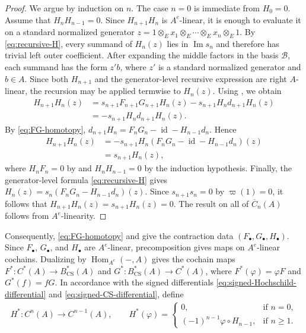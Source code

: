 \documentclass[11pt,a4paper,reqno]{amsart}
\newcommand{\mB}{\mathcal B}
\newcommand{\Hom}{\operatorname{Hom}}
\newcommand{\id}{\operatorname{id}}
\theoremstyle{plain}
\theoremstyle{definition}
\numberwithin{equation}{section}
\begin{document}
	\begin{proof}
		We argue by induction on $n$.  The case $n=0$ is immediate from $H_0=0$.
		Assume that
		$H_nH_{n-1}=0$.
		Since $H_{n+1}H_n$ is $A^e$-linear, it is enough to evaluate it on a
		standard normalized generator
		$z= 1\otimes_E x_1\otimes_E\cdots\otimes_E x_n\otimes_E1$.
		By \eqref{eq:recursive-H}, every summand of $H_n(z)$ lies in
		$\operatorname{Im}s_n$ and therefore has trivial left outer coefficient.
		After expanding the middle factors in the basis $\mB$, each summand
		has the form $z'b$, where $z'$ is a standard normalized generator and
		$b\in A$. Since both $H_{n+1}$ and the generator-level recursive expression
		are right $A$-linear, the recursion may be applied termwise to $H_n(z)$.
		Using , we obtain
		\begin{align*}
			H_{n+1}H_n(z)
			&=
			s_{n+1}F_{n+1}G_{n+1}H_n(z)
			-
			s_{n+1}H_nd_{n+1}H_n(z)
			\\
			&=
			-s_{n+1}H_nd_{n+1}H_n(z).
		\end{align*}
		By \eqref{eq:FG-homotopy},
		$d_{n+1}H_n = F_nG_n-\id-H_{n-1}d_n$.
		Hence
		\begin{align*}
			H_{n+1}H_n(z)
			&=
			-s_{n+1}H_n
			(F_nG_n-\id-H_{n-1}d_n)(z)
			\\
			&=
			s_{n+1}H_n(z),
		\end{align*}
		where $H_nF_n=0$ by  and
		$H_nH_{n-1}=0$ by the induction hypothesis.  Finally, the
		generator-level formula \eqref{eq:recursive-H} gives
		$H_n(z) = s_n(F_nG_n-H_{n-1}d_n)(z)$.
		Since $s_{n+1}s_n=0$ by $\varpi(1)=0$, it follows that
		$H_{n+1}H_n(z)=s_{n+1}H_n(z)=0$.
		The result on all of $\overline C_n(A)$ follows from $A^e$-linearity.
	\end{proof}
	
	Consequently, \eqref{eq:FG-homotopy} and
	give the contraction data $(F_\bullet,G_\bullet,H_\bullet)$.
	Since $F_\bullet$, $G_\bullet$, and $H_\bullet$ are $A^e$-linear,
	precomposition gives maps on $A^e$-linear cochains. Dualizing by
	$\Hom_{A^e}(-,A)$ gives the cochain maps $F^*:C^*(A)\to B_{\mathrm{CS}}^*(A)$ and $G^*:B_{\mathrm{CS}}^*(A)\to C^*(A)$, where $F^*(\varphi)=\varphi F$ and $G^*(f)=fG$.
	In accordance with the signed differentials
	\eqref{eq:signed-Hochschild-differential} and
	\eqref{eq:signed-CS-differential}, define
	\begin{equation}\label{eq:signed-dual-homotopy}
		\begin{aligned}
			H^*:C^n(A)\longrightarrow C^{n-1}(A),\qquad
			H^*(\varphi)=
			\begin{cases}
				0, & \text{if } n=0,\\
				(-1)^{n-1}\varphi\circ H_{n-1}, & \text{if } n\geq1.
			\end{cases}
		\end{aligned}
	\end{equation}
	
\end{document}
